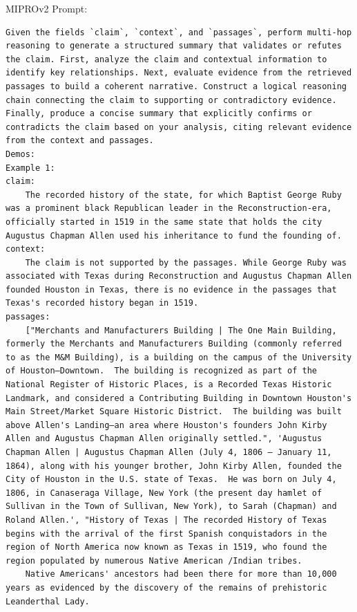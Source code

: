 \begin{instructbox}
MIPROv2 Prompt:
\begin{lstlisting}[breakindent=0pt, breaklines=true, breakatwhitespace=true, frame=single, backgroundcolor=\color{green!10}]
Given the fields `claim`, `context`, and `passages`, perform multi-hop reasoning to generate a structured summary that validates or refutes the claim. First, analyze the claim and contextual information to identify key relationships. Next, evaluate evidence from the retrieved passages to build a coherent narrative. Construct a logical reasoning chain connecting the claim to supporting or contradictory evidence. Finally, produce a concise summary that explicitly confirms or contradicts the claim based on your analysis, citing relevant evidence from the context and passages.
Demos:
Example 1:
claim:
    The recorded history of the state, for which Baptist George Ruby was a prominent black Republican leader in the Reconstruction-era, officially started in 1519 in the same state that holds the city Augustus Chapman Allen used his inheritance to fund the founding of.
context:
    The claim is not supported by the passages. While George Ruby was associated with Texas during Reconstruction and Augustus Chapman Allen founded Houston in Texas, there is no evidence in the passages that Texas's recorded history began in 1519.
passages:
    ["Merchants and Manufacturers Building | The One Main Building, formerly the Merchants and Manufacturers Building (commonly referred to as the M&M Building), is a building on the campus of the University of Houston–Downtown.  The building is recognized as part of the National Register of Historic Places, is a Recorded Texas Historic Landmark, and considered a Contributing Building in Downtown Houston's Main Street/Market Square Historic District.  The building was built above Allen's Landing—an area where Houston's founders John Kirby Allen and Augustus Chapman Allen originally settled.", 'Augustus Chapman Allen | Augustus Chapman Allen (July 4, 1806 – January 11, 1864), along with his younger brother, John Kirby Allen, founded the City of Houston in the U.S. state of Texas.  He was born on July 4, 1806, in Canaseraga Village, New York (the present day hamlet of Sullivan in the Town of Sullivan, New York), to Sarah (Chapman) and Roland Allen.', "History of Texas | The recorded History of Texas begins with the arrival of the first Spanish conquistadors in the region of North America now known as Texas in 1519, who found the region populated by numerous Native American /Indian tribes.  
    Native Americans' ancestors had been there for more than 10,000 years as evidenced by the discovery of the remains of prehistoric Leanderthal Lady.  

\end{lstlisting}
\end{instructbox}
